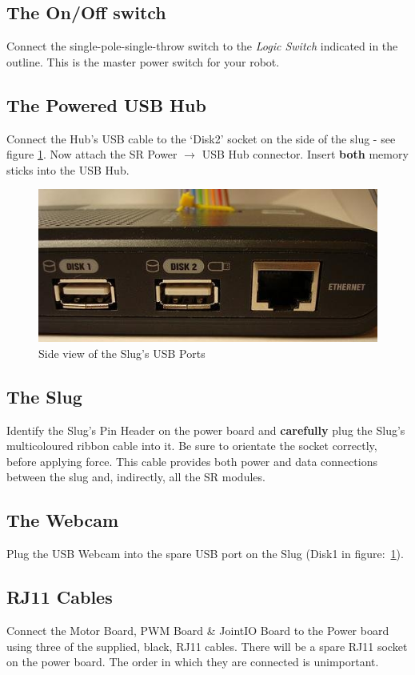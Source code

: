 \documentclass[a4paper, 12pt]{article}
\begin{document}
\subsection{The On/Off switch}
Connect the single-pole-single-throw switch to the \textit{Logic Switch} indicated in the outline. This is the master power switch for your robot.

\subsection{The Powered USB Hub}
Connect the Hub's USB cable to the `Disk2' socket on the side of the slug - see figure \ref{fig:slug-side}. Now attach the SR Power \(\rightarrow\) USB Hub connector. Insert \textbf{both} memory sticks into the USB Hub.

\begin{figure}[h!]
\center
\includegraphics[scale=0.6]{slug-side-view}
\caption{Side view of the Slug's USB Ports}
\label{fig:slug-side}
\end{figure}

\subsection{The Slug}
Identify the Slug's Pin Header on the power board and \textbf{carefully} plug the Slug's multicoloured ribbon cable into it. Be sure to orientate the socket correctly, before applying force. This cable provides both power and data connections between the slug and, indirectly, all the SR modules.

\subsection{The Webcam}
Plug the USB Webcam into the spare USB port on the Slug (Disk1 in figure:\ \ref{fig:slug-side}).

\subsection{RJ11 Cables}
Connect the Motor Board, PWM Board \& JointIO Board to the Power board using three of the supplied, black, RJ11 cables. There will be a spare RJ11 socket on the power board. The order in which they are connected is unimportant. 
\end{document}
